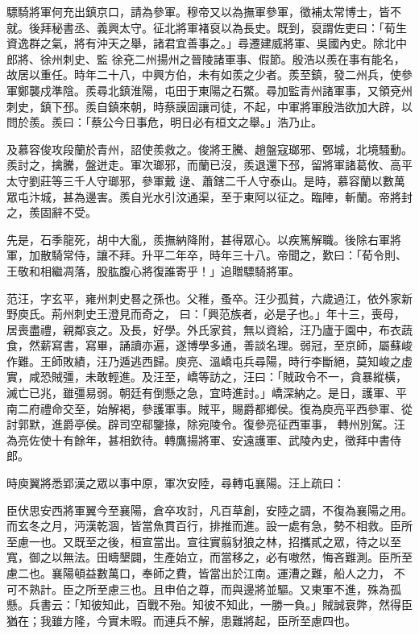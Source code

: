 \begin{pinyinscope}
 驃騎將軍何充出鎮京口，請為參軍。穆帝又以為撫軍參軍，徵補太常博士，皆不就。後拜秘書丞、義興太守。征北將軍褚裒以為長史。既到，裒謂佐吏曰：「荀生資逸群之氣，將有沖天之舉，諸君宜善事之。」尋遷建威將軍、吳國內史。除北中郎將、徐州刺史、監
 徐兗二州揚州之晉陵諸軍事、假節。殷浩以羨在事有能名，故居以重任。時年二十八，中興方伯，未有如羨之少者。羨至鎮，發二州兵，使參軍鄭襲戍準陰。羨尋北鎮淮陽，屯田于東陽之石鱉。尋加監青州諸軍事，又領兗州刺史，鎮下邳。羨自鎮來朝，時蔡謨固讓司徒，不起，中軍將軍殷浩欲加大辟，以問於羨。羨曰：「蔡公今日事危，明日必有桓文之舉。」浩乃止。



 及慕容俊攻段蘭於青州，詔使羨救之。俊將王騰、趙盤寇瑯邪、鄄城，北境騷動。羨討之，擒騰，盤迸走。軍次瑯邪，而蘭已沒，羨退還下邳，留將軍諸葛攸、高平太守劉莊等三千人守瑯邪，參軍戴
 逯、蕭鎋二千人守泰山。是時，慕容蘭以數萬眾屯汴城，甚為邊害。羨自光水引汶通渠，至于東阿以征之。臨陣，斬蘭。帝將封之，羨固辭不受。



 先是，石季龍死，胡中大亂，羨撫納降附，甚得眾心。以疾篤解職。後除右軍將軍，加散騎常侍，讓不拜。升平二年卒，時年三十八。帝聞之，歎曰：「荀令則、王敬和相繼凋落，股肱腹心將復誰寄乎！」追贈驃騎將軍。



 范汪，字玄平，雍州刺史晷之孫也。父稚，蚤卒。汪少孤貧，六歲過江，依外家新野庾氏。荊州刺史王澄見而奇之，
 曰：「興范族者，必是子也。」年十三，喪母，居喪盡禮，親鄰哀之。及長，好學。外氏家貧，無以資給，汪乃廬于園中，布衣蔬食，然薪寫書，寫畢，誦讀亦遍，遂博學多通，善談名理。弱冠，至京師，屬蘇峻作難。王師敗績，汪乃遁逃西歸。庾亮、溫嶠屯兵尋陽，時行李斷絕，莫知峻之虛實，咸恐賊彊，未敢輕進。及汪至，嶠等訪之，汪曰：「賊政令不一，貪暴縱橫，滅亡已兆，雖彊易弱。朝廷有倒懸之急，宜時進討。」嶠深納之。是日，護軍、平南二府禮命交至，始解褐，參護軍事。賊平，賜爵都鄉侯。復為庾亮平西參軍、從討郭默，進爵亭侯。辟司空郗鑒掾，除宛陵令。復參亮征西軍事，
 轉州別駕。汪為亮佐使十有餘年，甚相欽待。轉鷹揚將軍、安遠護軍、武陵內史，徵拜中書侍郎。



 時庾翼將悉郢漢之眾以事中原，軍次安陸，尋轉屯襄陽。汪上疏曰：



 臣伏思安西將軍翼今至襄陽，倉卒攻討，凡百草創，安陸之調，不復為襄陽之用。而玄冬之月，沔漢乾涸，皆當魚貫百行，排推而進。設一處有急，勢不相救。臣所至慮一也。又既至之後，桓宣當出。宣往實翦豺狼之林，招攜貳之眾，待之以至寬，御之以無法。田疇墾闢，生產始立，而當移之，必有嗷然，悔吝難測。臣所至慮二也。襄陽頓益數萬口，奉師之費，皆當出於江南。運漕之難，船人之力，
 不可不熟計。臣之所至慮三也。且申伯之尊，而與邊將並驅。又東軍不進，殊為孤懸。兵書云：「知彼知此，百戰不殆。知彼不知此，一勝一負。」賊誠衰弊，然得臣猶在；我雖方隆，今實未暇。而連兵不解，患難將起，臣所至慮四也。




\end{pinyinscope}
